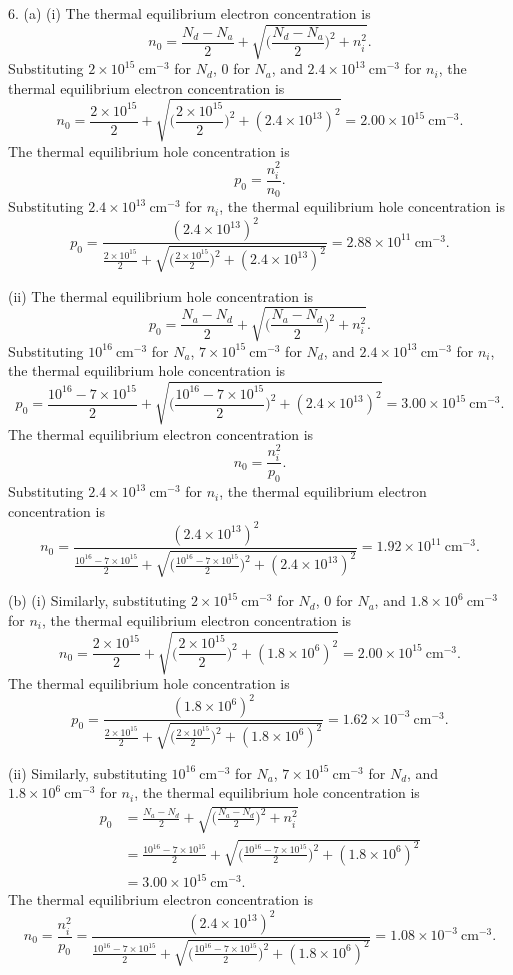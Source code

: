 \documentclass[a4paper]{article}
\begin{document}
6. (a) (i) The thermal equilibrium electron concentration is
$$n_0=\frac{N_d-N_a}{2}+\sqrt{\Big(\frac{N_d-N_a}{2}\Big)^2+n_i^2}.$$
Substituting $2\times10^{15}\ \text{cm}^{-3}$ for $N_d$, $0$ for $N_a$, and $2.4\times10^{13}\ \text{cm}^{-3}$ for $n_i$, the thermal equilibrium electron concentration is
$$n_0=\frac{2\times10^{15}}{2}+\sqrt{\Big(\frac{2\times10^{15}}{2}\Big)^2+(2.4\times10^{13})^2}=2.00\times10^{15}\ \text{cm}^{-3}.$$
The thermal equilibrium hole concentration is
$$p_0=\frac{n_i^2}{n_0}.$$
Substituting $2.4\times10^{13}\ \text{cm}^{-3}$ for $n_i$, the thermal equilibrium hole concentration is
$$p_0=\frac{(2.4\times10^{13})^2}{\frac{2\times10^{15}}{2}+\sqrt{\big(\frac{2\times10^{15}}{2}\big)^2+(2.4\times10^{13})^2}}=2.88\times10^{11}\ \text{cm}^{-3}.$$

(ii) The thermal equilibrium hole concentration is
$$p_0=\frac{N_a-N_d}{2}+\sqrt{\Big(\frac{N_a-N_d}{2}\Big)^2+n_i^2}.$$
Substituting $10^{16}\ \text{cm}^{-3}$ for $N_a$, $7\times10^{15}\ \text{cm}^{-3}$ for $N_d$, and $2.4\times10^{13}\ \text{cm}^{-3}$ for $n_i$, the thermal equilibrium hole concentration is
$$p_0=\frac{10^{16}-7\times10^{15}}{2}+\sqrt{\Big(\frac{10^{16}-7\times10^{15}}{2}\Big)^2+(2.4\times10^{13})^2}=3.00\times10^{15}\ \text{cm}^{-3}.$$
The thermal equilibrium electron concentration is
$$n_0=\frac{n_i^2}{p_0}.$$
Substituting $2.4\times10^{13}\ \text{cm}^{-3}$ for $n_i$, the thermal equilibrium electron concentration is
$$n_0=\frac{(2.4\times10^{13})^2}{\frac{10^{16}-7\times10^{15}}{2}+\sqrt{\big(\frac{10^{16}-7\times10^{15}}{2}\big)^2+(2.4\times10^{13})^2}}=1.92\times10^{11}\ \text{cm}^{-3}.$$

(b) (i) Similarly, substituting $2\times10^{15}\ \text{cm}^{-3}$ for $N_d$, $0$ for $N_a$, and $1.8\times10^{6}\ \text{cm}^{-3}$ for $n_i$, the thermal equilibrium electron concentration is
$$n_0=\frac{2\times10^{15}}{2}+\sqrt{\Big(\frac{2\times10^{15}}{2}\Big)^2+(1.8\times10^{6})^2}=2.00\times10^{15}\ \text{cm}^{-3}.$$
The thermal equilibrium hole concentration is
$$p_0=\frac{(1.8\times10^{6})^2}{\frac{2\times10^{15}}{2}+\sqrt{\big(\frac{2\times10^{15}}{2}\big)^2+(1.8\times10^{6})^2}}=1.62\times10^{-3}\ \text{cm}^{-3}.$$

(ii) Similarly, substituting $10^{16}\ \text{cm}^{-3}$ for $N_a$, $7\times10^{15}\ \text{cm}^{-3}$ for $N_d$, and $1.8\times10^{6}\ \text{cm}^{-3}$ for $n_i$, the thermal equilibrium hole concentration is
\[
    \begin{aligned}
        p_0&=\frac{N_a-N_d}{2}+\sqrt{\Big(\frac{N_a-N_d}{2}\Big)^2+n_i^2}\\
        &=\frac{10^{16}-7\times10^{15}}{2}+\sqrt{\Big(\frac{10^{16}-7\times10^{15}}{2}\Big)^2+(1.8\times10^{6})^2}\\
        &=3.00\times10^{15}\ \text{cm}^{-3}.
    \end{aligned}
\]
The thermal equilibrium electron concentration is
$$n_0=\frac{n_i^2}{p_0}=\frac{(2.4\times10^{13})^2}{\frac{10^{16}-7\times10^{15}}{2}+\sqrt{\big(\frac{10^{16}-7\times10^{15}}{2}\big)^2+(1.8\times10^{6})^2}}=1.08\times10^{-3}\ \text{cm}^{-3}.$$
\end{document}

